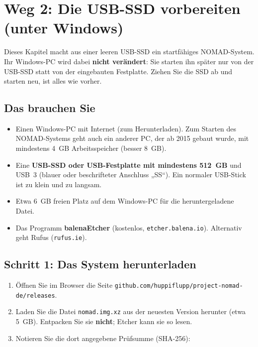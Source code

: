 \chapter{Weg 2: Die USB-SSD vorbereiten (unter Windows)}

Dieses Kapitel macht aus einer leeren USB-SSD ein startfähiges NOMAD-System. Ihr Windows-PC wird dabei \textbf{nicht verändert}: Sie starten ihn später nur von der USB-SSD statt von der eingebauten Festplatte. Ziehen Sie die SSD ab und starten neu, ist alles wie vorher.

\section{Das brauchen Sie}
\begin{itemize}[leftmargin=1.5em,itemsep=2pt,label={\abhaken}]
\item Einen Windows-PC mit Internet (zum Herunterladen). Zum Starten des NOMAD-Systems geht auch ein anderer PC, der ab 2015 gebaut wurde, mit mindestens 4~GB Arbeitsspeicher (besser 8~GB).
\item Eine \textbf{USB-SSD oder USB-Festplatte mit mindestens 512~GB} und USB~3 (blauer oder beschrifteter Anschluss „SS“). Ein normaler USB-Stick ist zu klein und zu langsam.
\item Etwa \SI{6}{GB} freien Platz auf dem Windows-PC für die heruntergeladene Datei.
\item Das Programm \textbf{balenaEtcher} (kostenlos, \texttt{etcher.balena.io}). Alternativ geht Rufus (\texttt{rufus.ie}).
\end{itemize}


\section{Schritt 1: Das System herunterladen}
\begin{enumerate}[leftmargin=1.5em,itemsep=3pt]
\item Öffnen Sie im Browser die Seite \texttt{github.com/huppiflupp/project-nomad-de/releases}.
\item Laden Sie die Datei \texttt{nomad.img.xz} aus der neuesten Version herunter (etwa \SI{5}{GB}). Entpacken Sie sie \textbf{nicht}; Etcher kann sie so lesen.
\item Notieren Sie die dort angegebene Prüfsumme (SHA-256): \feld[8.5cm]
\end{enumerate}

